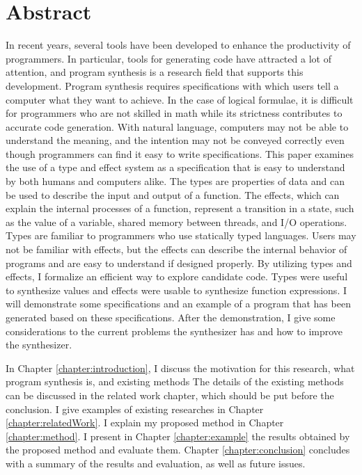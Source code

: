 \documentclass[12pt, a4paper, titlepage]{report}
\begin{document}
\chapter*{Abstract} \label{chapter:abstract}
In recent years, several tools have been developed to enhance the productivity of programmers.
In particular, tools for generating code have attracted a lot of attention, and program synthesis is a research field that supports this development.
Program synthesis requires specifications with which users tell a computer what they want to achieve.
In the case of logical formulae, it is
difficult for programmers who are not skilled in math while its strictness contributes to accurate code generation.
With natural language, computers may not be able to understand the meaning, and the intention may not be conveyed correctly even though programmers can find it easy to write specifications.
This paper examines the use of a type and effect system as a specification that is easy to understand by both humans and computers alike. The types are properties of data and can be used to describe the input and output of a function. The effects, which can explain the internal processes of a function, represent a transition in a state, such as the value of a variable, shared memory between threads, and I/O operations.
Types are familiar to programmers who use statically typed languages.
Users may not be familiar with effects, but the effects can describe the internal behavior of programs and are easy to understand if designed properly.
By utilizing types and effects, I formalize an efficient way to explore candidate code.
Types were useful to synthesize values and effects were usable to synthesize function expressions.
I will demonstrate some specifications and an example of a program that has been generated based on these specifications.
After the demonstration, I give some considerations to the current problems the synthesizer has and how to improve the synthesizer.

In Chapter \ref{chapter:introduction}, I discuss the motivation for this research, what program synthesis is, and existing methods  The details of the existing methods can be discussed in the related work chapter, which should be  put before the conclusion.
I give examples of existing researches in Chapter \ref{chapter:relatedWork}.
I explain my proposed method in Chapter \ref{chapter:method}.
I present in Chapter \ref{chapter:example} the results obtained by the proposed method and evaluate them.
Chapter \ref{chapter:conclusion} concludes with a summary of the results and evaluation, as well as future issues.
\end{document}
